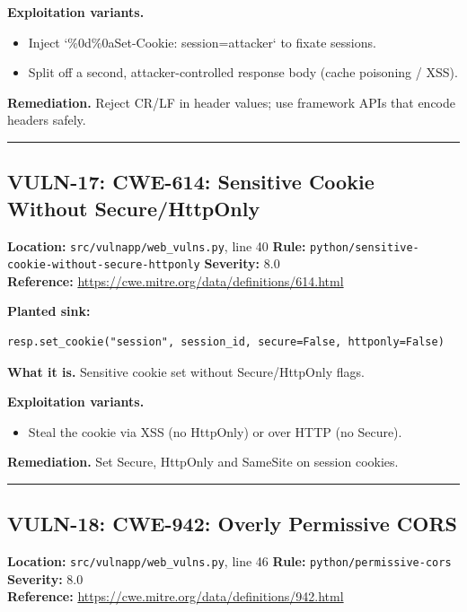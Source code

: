 \documentclass[11pt,a4paper]{article}
\begin{document}
\noindent\textbf{Exploitation variants.}
\begin{itemize}[leftmargin=1.4em,itemsep=1pt,topsep=2pt]
\item Inject `\%0d\%0aSet-Cookie: session=attacker` to fixate sessions.
\item Split off a second, attacker-controlled response body (cache poisoning / XSS).
\end{itemize}
\noindent\textbf{Remediation.} Reject CR/LF in header values; use framework APIs that encode headers safely.

\vspace{4pt}\hrule\vspace{6pt}
\subsection{VULN-17: CWE-614: Sensitive Cookie Without Secure/HttpOnly}
\noindent\textbf{Location:} \texttt{src/vulnapp/web\_vulns.py}, line 40 \quad \textbf{Rule:} \texttt{python/sensitive-cookie-without-secure-httponly} \quad \textbf{Severity:} 8.0
\\ \textbf{Reference:} \url{https://cwe.mitre.org/data/definitions/614.html}

\noindent\textbf{Planted sink:}
\begin{lstlisting}
resp.set_cookie("session", session_id, secure=False, httponly=False)
\end{lstlisting}
\noindent\textbf{What it is.} Sensitive cookie set without Secure/HttpOnly flags.

\noindent\textbf{Exploitation variants.}
\begin{itemize}[leftmargin=1.4em,itemsep=1pt,topsep=2pt]
\item Steal the cookie via XSS (no HttpOnly) or over HTTP (no Secure).
\end{itemize}
\noindent\textbf{Remediation.} Set Secure, HttpOnly and SameSite on session cookies.

\vspace{4pt}\hrule\vspace{6pt}
\subsection{VULN-18: CWE-942: Overly Permissive CORS}
\noindent\textbf{Location:} \texttt{src/vulnapp/web\_vulns.py}, line 46 \quad \textbf{Rule:} \texttt{python/permissive-cors} \quad \textbf{Severity:} 8.0
\\ \textbf{Reference:} \url{https://cwe.mitre.org/data/definitions/942.html}
\end{document}
